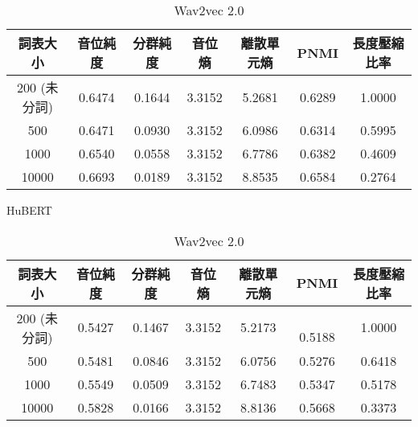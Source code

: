         \begin{table}[!htbp]
            \centering
            \begin{subtable}[t]{\textwidth}
                \centering
                \begin{tabular}{|c|c|c|c|c|c|c|} \hline 
                        詞表大小  & 音位純度 & 分群純度 & 音位熵 & 離散單元熵 &    PNMI & 長度壓縮比率 \\ \hline 
 200 (未分詞)&   0.6474 &   0.1644 & 3.3152 &     5.2681 & 0.6289 &1.0000\\ \hline 
                            500   & 0.6471   & 0.0930   & 3.3152 &  6.0986    &  0.6314 &  0.5995  \\ \hline %
                           1000   & 0.6540   & 0.0558   & 3.3152 &  6.7786    &  0.6382 &  0.4609  \\ \hline %
                          10000   & 0.6693   & 0.0189   & 3.3152 &  8.8535    &  0.6584 &  0.2764  \\ \hline %
                \end{tabular}
\caption{HuBERT}
                \label{tab:ch4-phn-model-hubert}
            \end{subtable}        

            \jefftablesep        

            \begin{subtable}[t]{\textwidth}
                \centering
                \begin{tabular}{|c|c|c|c|c|c|c|} \hline 
                        詞表大小  & 音位純度 & 分群純度 & 音位熵 & 離散單元熵 &    PNMI & 長度壓縮比率 \\ \hline 
 200 (未分詞)&   0.5427 &   0.1467 & 3.3152 &     5.2173 &　0.5188 &1.0000\\ \hline 
                            500   & 0.5481   & 0.0846   & 3.3152 &  6.0756    &  0.5276 &  0.6418  \\ \hline %
                           1000   & 0.5549   & 0.0509   & 3.3152 &  6.7483    &  0.5347 &  0.5178  \\ \hline %
                          10000   & 0.5828   & 0.0166   & 3.3152 &  8.8136    &  0.5668 &  0.3373  \\ \hline %
                \end{tabular}
\caption{Wav2vec 2.0}
                \label{tab:ch4-phn-model-w2v2}
            \end{subtable}        


\end{table}
